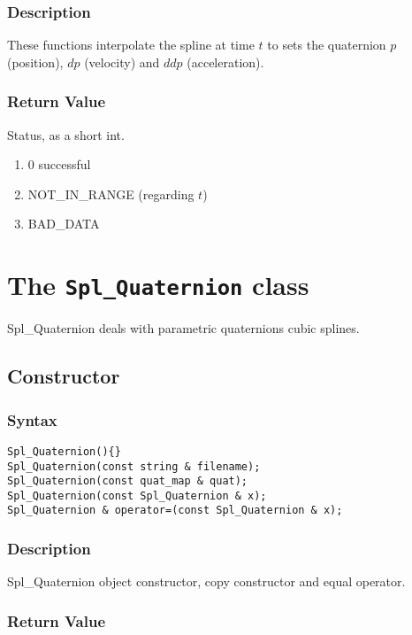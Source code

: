 \documentclass[dvips,11pt,fleqn]{report}
\begin{document}
\subsubsection*{Description}   
These functions interpolate the spline at time $t$ to sets the
quaternion $p$ (position), $dp$ (velocity) and $ddp$ (acceleration).

\subsubsection*{Return Value}

Status, as a short int.
\begin{enumerate}
\item[] 0 successful
\item[] NOT\_IN\_RANGE (regarding $t$)
\item[] BAD\_DATA
\end{enumerate}

\newpage

\section{The \texttt{Spl\_Quaternion} class}

Spl\_Quaternion deals with parametric quaternions cubic splines.

\subsection*{Constructor}
\subsubsection*{Syntax}
\begin{verbatim}
Spl_Quaternion(){}
Spl_Quaternion(const string & filename);
Spl_Quaternion(const quat_map & quat);
Spl_Quaternion(const Spl_Quaternion & x);
Spl_Quaternion & operator=(const Spl_Quaternion & x);
\end{verbatim}

\subsubsection*{Description}   
Spl\_Quaternion object constructor, copy constructor and equal operator.

\subsubsection*{Return Value}
\end{document}
